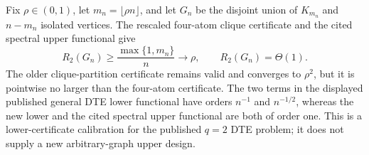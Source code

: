 Fix \(\rho\in(0,1)\), let \(m_n=\lfloor\rho n\rfloor\), and let \(G_n\) be the disjoint union of \(K_{m_n}\) and \(n-m_n\) isolated vertices.  The rescaled four-atom clique certificate and the cited spectral upper functional give
\[
R_2(G_n)\geq\frac{\max\{1,m_n\}}n\longrightarrow\rho,
\qquad
R_2(G_n)=\Theta(1).
\]
The older clique-partition certificate remains valid and converges to \(\rho^2\), but it is pointwise no larger than the four-atom certificate.  The two terms in the displayed published general DTE lower functional have orders \(n^{-1}\) and \(n^{-1/2}\), whereas the new lower and the cited spectral upper functional are both of order one.  This is a lower-certificate calibration for the published \(q=2\) DTE problem; it does not supply a new arbitrary-graph upper design.